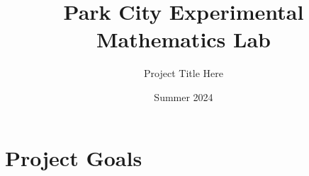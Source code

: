 \documentclass{beamer}
\title
{Park City Experimental Mathematics Lab} %
\subtitle
{Project Title Here}
\date{Summer 2024}
\institute[PCMI 2024] %
{
Park City Mathematics Institute}
\begin{document}
\begin{frame}
\titlepage
\end{frame}











\section{Project Goals}
\end{document}
